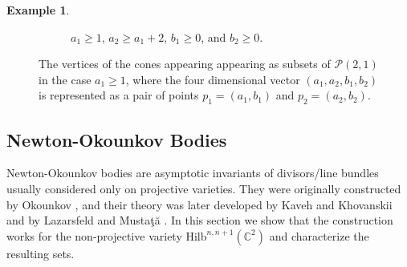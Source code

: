 \documentclass[12pt]{amsart}
\newcommand{\Hilb}{\mathrm{Hilb}}
\newcommand{\C}{\mathbb{C}}
\numberwithin{equation}{section}
\theoremstyle{definition}
\newtheorem{example}[theorem]{Example}
\begin{document}
\begin{example}
\begin{figure}[h]
\begin{subfigure}{.3\textwidth}
    \caption{$a_1\geq 1$, $a_2\geq a_1+2$, $b_1\geq 0$, and $b_2\geq 0$.}
    \end{subfigure}
    \caption{The vertices of the cones appearing appearing as subsets of $\mathcal{P}(2,1)$ in the case $a_1\geq 1$, where the four dimensional vector $(a_1,a_2,b_1,b_2)$ is represented as a pair of points $p_1 = (a_1,b_1)$ and $p_2 =(a_2,b_2)$.}
    \label{fig:a1greaterthan0}
    \end{figure}
\end{example}


\subsection{Newton-Okounkov Bodies}\label{sec: NO bodies}


Newton-Okounkov bodies are asymptotic invariants of divisors/line bundles usually considered only on projective varieties. They were originally constructed by Okounkov \cite{O}, and their theory was later developed by Kaveh and Khovanskii \cite{KK} and by Lazarsfeld and Musta\c{t}\u{a} \cite{LM}. In this section we show that the construction works for the non-projective variety $\Hilb^{n,n+1}(\C^2)$ and characterize the resulting sets.
\end{document}
